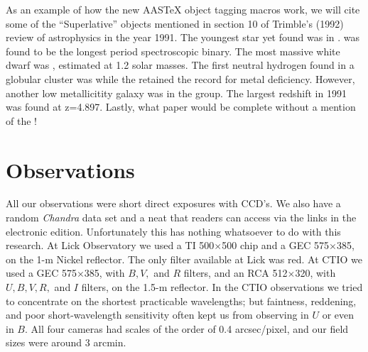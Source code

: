 \documentclass[manuscript]{aastex}
\begin{document}
As an example of how the new AASTeX object tagging macros work, we will
cite some of the ``Superlative'' objects mentioned in section 10 of
Trimble's (1992) review of astrophysics in the year 1991.  The youngest
star yet found was  in .
 was found to be the longest period spectroscopic binary.
The most massive white dwarf was , estimated at 1.2 solar masses.
The first neutral hydrogen found in a globular cluster was 
while the  retained the
record for metal deficiency.  However, another low metallicitity
galaxy was  in the  group. The
largest redshift  in 1991 was found at
z=4.897.  Lastly, what paper would be complete without a mention of the
!

\section{Observations}


All our observations were short direct exposures with CCD's.  We also have
a random {\it Chandra} data set  and a
neat  that readers can access
via the links in the electronic edition.  Unfortunately this has nothing 
whatsoever to do with this research.  At Lick Observatory we used a TI 500$\times$500 
chip and a GEC 575$\times$385, on the 1-m Nickel reflector.  The only
filter available at Lick was red.  At CTIO we used a GEC 575$\times$385, with
$B, V,$ and $R$ filters, and an RCA 512$\times$320, with $U, B, V, R,$ and $I$
filters, on the 1.5-m reflector. In the CTIO observations we tried to
concentrate on the shortest practicable wavelengths; but faintness, reddening,
and poor short-wavelength sensitivity often kept us from observing in $U$ or
even in $B$. All four cameras had scales of the order of 0.4 arcsec/pixel, and
our field sizes were around 3 arcmin.
\end{document}
